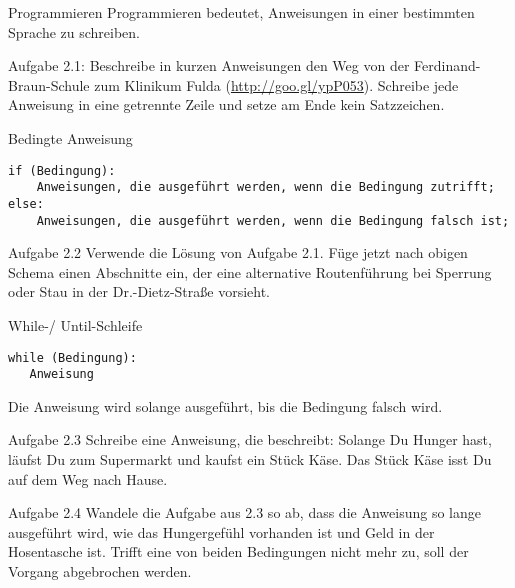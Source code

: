 \documentclass[presentation]{beamer}
\begin{document}
\begin{frame}[fragile,label={sec:orgheadline2}]{Programmieren}
 Programmieren bedeutet, Anweisungen in einer bestimmten Sprache zu schreiben.

\begin{block}{Aufgabe 2.1:}
Beschreibe in kurzen Anweisungen den Weg von der Ferdinand-Braun-Schule zum Klinikum Fulda (\url{http://goo.gl/ypP053}).  Schreibe jede Anweisung in eine getrennte Zeile und setze am Ende kein Satzzeichen.
\end{block}

\begin{block}{Bedingte Anweisung}
\label{orgexampleblock1}
\begin{verbatim}
if (Bedingung):
    Anweisungen, die ausgeführt werden, wenn die Bedingung zutrifft;
else:
    Anweisungen, die ausgeführt werden, wenn die Bedingung falsch ist;
\end{verbatim}
\end{block}


\begin{block}{Aufgabe 2.2}
Verwende die Lösung von Aufgabe 2.1. Füge jetzt nach obigen Schema einen Abschnitte ein, der eine alternative Routenführung bei Sperrung oder Stau in der Dr.-Dietz-Straße vorsieht.
\end{block}

\begin{block}{While-/ Until-Schleife}
\label{orgexampleblock2}
\begin{verbatim}
while (Bedingung):
   Anweisung
\end{verbatim}

Die Anweisung wird solange ausgeführt, bis die Bedingung falsch wird.
\end{block}

\begin{block}{Aufgabe 2.3}
Schreibe eine Anweisung, die beschreibt:
Solange Du Hunger hast, läufst Du zum Supermarkt und kaufst ein Stück Käse. Das Stück Käse isst Du auf dem Weg nach Hause.
\end{block}

\begin{block}{Aufgabe 2.4}
Wandele die Aufgabe aus 2.3 so ab, dass die Anweisung so lange ausgeführt wird, wie das Hungergefühl vorhanden ist und Geld in der Hosentasche ist. Trifft eine von beiden Bedingungen nicht mehr zu, soll der Vorgang abgebrochen werden.
\end{block}


\end{frame}
\end{document}
